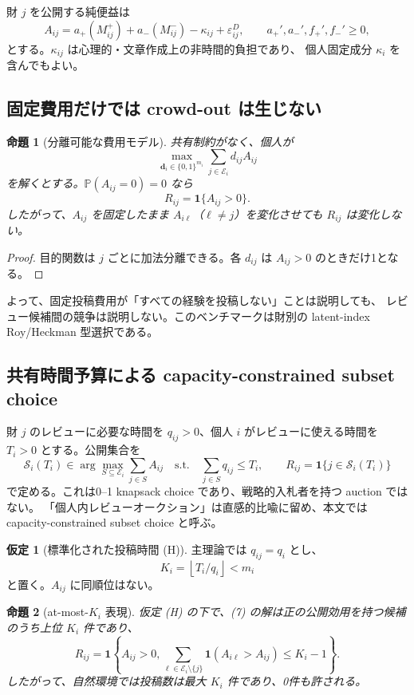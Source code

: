 \documentclass[a4paper,11pt]{ltjsarticle}
\newcommand{\Prb}{\mathbb P}
\newcommand{\1}{\mathbf 1}
\newcommand{\cE}{\mathcal E}
\newcommand{\cS}{\mathcal S}
\theoremstyle{definition}
\newtheorem{assumption}{仮定}
\theoremstyle{plain}
\newtheorem{proposition}{命題}
\theoremstyle{remark}
\begin{document}
財 $j$ を公開する純便益は
\[
 A_{ij}
 =a_+(M^+_{ij})+a_-(M^-_{ij})
 -\kappa_{ij}+\varepsilon^D_{ij},
 \qquad a_+',a_-',f_+',f_-'\ge0,
 \tag{4}
\]
とする。$\kappa_{ij}$ は心理的・文章作成上の非時間的負担であり、
個人固定成分 $\kappa_i$ を含んでもよい。

\subsection{固定費用だけでは crowd-out は生じない}

\begin{proposition}[分離可能な費用モデル]
共有制約がなく、個人が
\[
 \max_{\bm d_i\in\{0,1\}^{m_i}}
 \sum_{j\in\cE_i}d_{ij}A_{ij}
 \tag{5}
\]
を解くとする。$\Prb(A_{ij}=0)=0$ なら
\[
 R_{ij}=\1\{A_{ij}>0\}.
 \tag{6}
\]
したがって、$A_{ij}$ を固定したまま $A_{i\ell}$（$\ell\ne j$）を変化させても
$R_{ij}$ は変化しない。
\end{proposition}

\begin{proof}
目的関数は $j$ ごとに加法分離できる。各 $d_{ij}$ は $A_{ij}>0$ のときだけ1となる。
\end{proof}

よって、固定投稿費用が「すべての経験を投稿しない」ことは説明しても、
レビュー候補間の競争は説明しない。このベンチマークは財別の latent-index
Roy/Heckman 型選択である。

\subsection{共有時間予算による capacity-constrained subset choice}

財 $j$ のレビューに必要な時間を $q_{ij}>0$、個人 $i$ がレビューに使える時間を
$T_i>0$ とする。公開集合を
\[
 \cS_i(T_i)\in
 \arg\max_{S\subseteq\cE_i}\sum_{j\in S}A_{ij}
 \quad\text{s.t.}\quad
 \sum_{j\in S}q_{ij}\le T_i,
 \qquad R_{ij}=\1\{j\in\cS_i(T_i)\}
 \tag{7}
\]
で定める。これは0--1 knapsack choice であり、戦略的入札者を持つ auction ではない。
「個人内レビューオークション」は直感的比喩に留め、本文では
capacity-constrained subset choice と呼ぶ。

\begin{assumption}[標準化された投稿時間 (H)]
主理論では $q_{ij}=q_i$ とし、
\[
 K_i=\left\lfloor T_i/q_i\right\rfloor<m_i
 \tag{8}
\]
と置く。$A_{ij}$ に同順位はない。
\end{assumption}

\begin{proposition}[at-most-$K_i$ 表現]
仮定 (H) の下で、(7) の解は正の公開効用を持つ候補のうち上位 $K_i$ 件であり、
\[
 R_{ij}=\1\left\{
 A_{ij}>0,
 \sum_{\ell\in\cE_i\setminus\{j\}}
 \1(A_{i\ell}>A_{ij})\le K_i-1
 \right\}.
 \tag{9}
\]
したがって、自然環境では投稿数は最大 $K_i$ 件であり、0件も許される。
\end{proposition}
\end{document}
